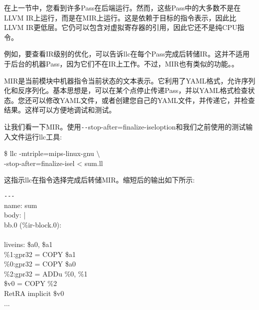 在上一节中，您看到许多Pass在后端运行。然而，这些Pass中的大多数不是在LLVM IR上运行，而是在MIR上运行。这是依赖于目标的指令表示，因此比LLVM IR更低层。它仍可以包含对虚拟寄存器的引用，因此它还不是纯CPU指令。\par

例如，要查看IR级别的优化，可以告诉llc在每个Pass完成后转储IR。这并不适用于后台的机器Pass，因为它们不在IR上工作。不过，MIR也有类似的功能。。\par

MIR是当前模块中机器指令当前状态的文本表示。它利用了YAML格式，允许序列化和反序列化。基本思想是，可以在某个点停止传递Pass，并以YAML格式检查状态。您还可以修改YAML文件，或者创建您自己的YAML文件，并传递它，并检查结果。这样可以方便地调试和测试。\par

让我们看一下MIR。使用\verb|--|stop-after=finalize-iseloption和我们之前使用的测试输入文件运行llc工具:\par

\begin{tcolorbox}[colback=white,colframe=black]
\$ llc -mtriple=mips-linux-gnu $\setminus$ \\
\hspace*{2cm}-stop-after=finalize-isel < sum.ll
\end{tcolorbox}

这指示llc在指令选择完成后转储MIR。缩短后的输出如下所示:\par

\begin{tcolorbox}[colback=white,colframe=black]
\verb|---| \\
name: \hspace{3cm}sum \\
body: \hspace{3cm}| \\
\hspace*{0.5cm}bb.0 (\%ir-block.0): \\
\\
\hspace*{0.5cm}liveins: \$a0, \$a1 \\
\hspace*{0.5cm}\%1:gpr32 = COPY \$a1 \\
\hspace*{0.5cm}\%0:gpr32 = COPY \$a0 \\
\hspace*{0.5cm}\%2:gpr32 = ADDu \%0, \%1 \\
\hspace*{0.5cm}\$v0 = COPY \%2 \\
\hspace*{0.5cm}RetRA implicit \$v0 \\
... 

\end{tcolorbox}

